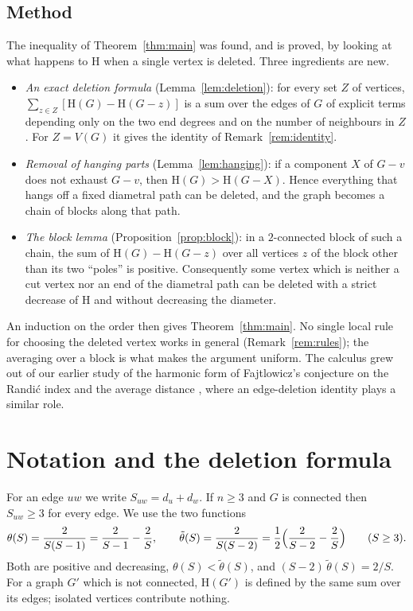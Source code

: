 \documentclass[11pt]{article}
\theoremstyle{definition}
\theoremstyle{remark}
\newcommand{\Hm}{\mathrm{H}}
\newcommand{\tht}{\theta}
\newcommand{\tth}{\tilde\theta}
\begin{document}
\subsection{Method}
The inequality of Theorem~\ref{thm:main} was found, and is proved, by looking at what happens
to $\Hm$ when a single vertex is deleted. Three ingredients are new.
\begin{itemize}
\item \emph{An exact deletion formula} (Lemma~\ref{lem:deletion}): for every set $Z$ of
 vertices, $\sum_{z\in Z}[\Hm(G)-\Hm(G-z)]$ is a sum over the edges of $G$ of explicit terms
 depending only on the two end degrees and on the number of neighbours in $Z$. For $Z=V(G)$
 it gives the identity of Remark~\ref{rem:identity}.
\item \emph{Removal of hanging parts} (Lemma~\ref{lem:hanging}): if a component $X$ of $G-v$
 does not exhaust $G-v$, then $\Hm(G)>\Hm(G-X)$. Hence everything that hangs off a fixed
 diametral path can be deleted, and the graph becomes a chain of blocks along that path.
\item \emph{The block lemma} (Proposition~\ref{prop:block}): in a $2$-connected block of such
 a chain, the sum of $\Hm(G)-\Hm(G-z)$ over all vertices $z$ of the block other than its two
 ``poles'' is positive. Consequently some vertex which is neither a cut vertex nor an end of
 the diametral path can be deleted with a strict decrease of $\Hm$ and without decreasing the
 diameter.
\end{itemize}
An induction on the order then gives Theorem~\ref{thm:main}. No single local rule for choosing
the deleted vertex works in general (Remark~\ref{rem:rules}); the averaging over a block is
what makes the argument uniform. The calculus grew out of our earlier study of the harmonic
form of Fajtlowicz's conjecture on the Randi\'c index and the average distance \cite{VMRC},
where an edge-deletion identity plays a similar role.

\section{Notation and the deletion formula}\label{sec:deletion}

For an edge $uw$ we write $S_{uw}=d_u+d_w$. If $n\ge3$ and $G$ is connected then
$S_{uw}\ge3$ for every edge. We use the two functions
\[
 \tht(S)=\frac{2}{S(S-1)}=\frac2{S-1}-\frac2S ,\qquad
 \tth(S)=\frac{2}{S(S-2)}=\frac12\Bigl(\frac2{S-2}-\frac2S\Bigr)\qquad(S\ge3).
\]
Both are positive and decreasing, $\tht(S)<\tth(S)$, and $(S-2)\,\tth(S)=2/S$. For a graph
$G'$ which is not connected, $\Hm(G')$ is defined by the same sum over its edges; isolated
vertices contribute nothing.
\end{document}
